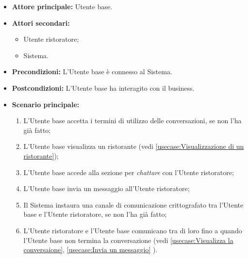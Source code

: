 \label{usecase:Interazione con il business}
\begin{itemize}
	\item \textbf{Attore principale:} Utente base.
	\item \textbf{Attori secondari:}
	      \begin{itemize}
		      \item Utente ristoratore;
		      \item Sistema.
	      \end{itemize}
	\item \textbf{Precondizioni:} L'Utente base è connesso al Sistema.
	\item \textbf{Postcondizioni:} L'Utente base ha interagito con il business.
	\item \textbf{Scenario principale:}
	      \begin{enumerate}
		      \item L'Utente base accetta i termini di utilizzo delle
		            conversazioni, se non l'ha già fatto;

		      \item L'Utente base visualizza un ristorante (vedi
		            \autoref{usecase:Visualizzazione di un ristorante});

		      \item L'Utente base accede alla sezione per \textit{chattare} con
		            l'Utente ristoratore;

		      \item L'Utente base invia un messaggio all'Utente ristoratore;

		      \item Il Sistema instaura una canale di comunicazione
		            crittografato tra l'Utente base e l'Utente ristoratore, se
		            non l'ha già fatto;

		      \item L'Utente ristoratore e l'Utente base comunicano tra di loro
		            fino a quando l'Utente base non termina la conversazione (vedi
		            \autoref{usecase:Visualizza la conversaione}, \autoref{usecase:Invia un
			            messaggio} %
		            ).
	      \end{enumerate}
\end{itemize}

